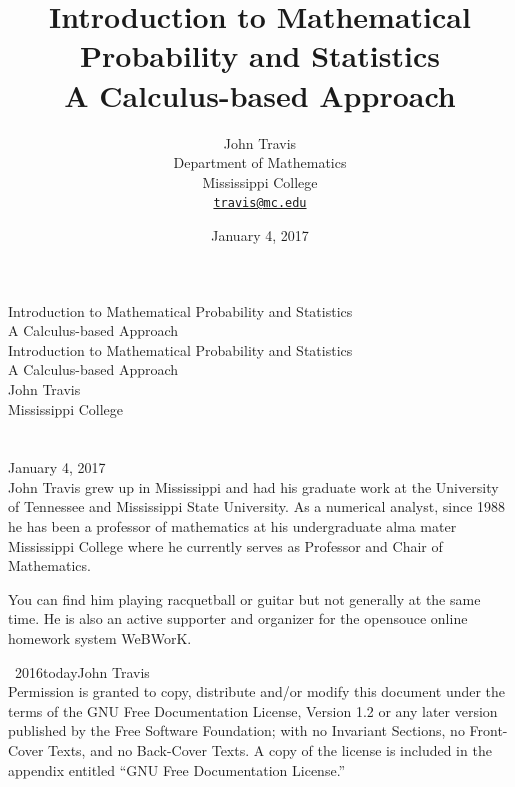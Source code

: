 \documentclass[10pt,]{book}
\title{Introduction to Mathematical Probability and Statistics\\
{\large A Calculus-based Approach}}
\author{John Travis\\
Department of Mathematics\\
Mississippi College\\
\href{mailto:travis@mc.edu}{\nolinkurl{travis@mc.edu}}
}
\date{January 4, 2017}
\theoremstyle{plain}
\theoremstyle{definition}
\theoremstyle{definition}
\theoremstyle{definition}
\numberwithin{equation}{section}
\begin{document}
\frontmatter
\thispagestyle{empty}
{\centering
\vspace*{0.28\textheight}
{\Huge Introduction to Mathematical Probability and Statistics}\\[2\baselineskip]
{\LARGE A Calculus-based Approach}\\
}
\clearpage
\thispagestyle{empty}
\null%
\clearpage
\thispagestyle{empty}
{\centering
\vspace*{0.14\textheight}
{\Huge Introduction to Mathematical Probability and Statistics}\\[\baselineskip]
{\LARGE A Calculus-based Approach}\\[3\baselineskip]
{\Large John Travis}\\[0.5\baselineskip]
{\Large Mississippi College}\\[3\baselineskip]
{\Large }\\[0.5\baselineskip]
{\normalsize }\\[3\baselineskip]
{\Large January 4, 2017}\\}
\clearpage
\thispagestyle{empty}
\noindent
John Travis grew up in Mississippi and had his graduate work at the University of Tennessee and Mississippi State University. As a numerical analyst, since 1988 he has been a professor of mathematics at his undergraduate alma mater Mississippi College where he currently serves as Professor and Chair of Mathematics.%
\par
You can find him playing racquetball or guitar but not generally at the same time. He is also an active supporter and organizer for the opensouce online homework system WeBWorK.%
\par
{}
\noindent\textcopyright\ 2016\textendash{}today\quad{}John Travis\\[0.5\baselineskip]
Permission is granted to copy, distribute and/or modify this document under the terms of the GNU Free Documentation License, Version 1.2 or any later version published by the Free Software Foundation; with no Invariant Sections, no Front-Cover Texts, and no Back-Cover Texts.  A copy of the license is included in the appendix entitled ``GNU Free Documentation License.''\par\medskip
{}
\null\clearpage
\end{document}
